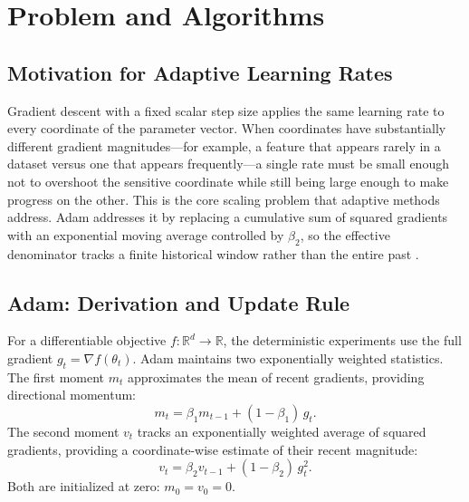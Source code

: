 ﻿\documentclass[conference]{IEEEtran}
\begin{document}
\section{Problem and Algorithms}

\subsection{Motivation for Adaptive Learning Rates}
Gradient descent with a fixed scalar step size applies the same learning rate to every coordinate of the parameter vector. When coordinates have substantially different gradient magnitudes---for example, a feature that appears rarely in a dataset versus one that appears frequently---a single rate must be small enough not to overshoot the sensitive coordinate while still being large enough to make progress on the other. This is the core scaling problem that adaptive methods address. Adam addresses it by replacing a cumulative sum of squared gradients with an exponential moving average controlled by $\beta_2$, so the effective denominator tracks a finite historical window rather than the entire past \cite{kingma}.

\subsection{Adam: Derivation and Update Rule}
For a differentiable objective $f:\mathbb{R}^d\to\mathbb{R}$, the deterministic experiments use the full gradient $g_t=\nabla f(\theta_t)$. Adam maintains two exponentially weighted statistics. The first moment $m_t$ approximates the mean of recent gradients, providing directional momentum:
\begin{equation}
  m_t = \beta_1 m_{t-1} + (1-\beta_1)\,g_t.
\end{equation}
The second moment $v_t$ tracks an exponentially weighted average of squared gradients, providing a coordinate-wise estimate of their recent magnitude:
\begin{equation}
  v_t = \beta_2 v_{t-1} + (1-\beta_2)\,g_t^2.
\end{equation}
Both are initialized at zero: $m_0 = v_0 = 0$.
\end{document}
